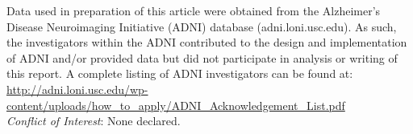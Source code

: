 Data used in preparation of this article were obtained from the Alzheimer's Disease Neuroimaging Initiative (ADNI) database (adni.loni.usc.edu). As such, the investigators within the ADNI contributed to the design and implementation of ADNI and/or provided data but did not participate in analysis or writing of this report. A complete listing of ADNI investigators can be found at: \url{http://adni.loni.usc.edu/wp-content/uploads/how_to_apply/ADNI_Acknowledgement_List.pdf}\\

{\it Conflict of Interest}: None declared.

%

%





\newpage
\address{Samuel Iddi\\
	Department of Statistics and Actuarial Science\\
	University of Ghana\\
	Legon-Accra, Ghana\\ 
	\url{https://orcid.org/0000-0002-2366-2774}\\
	\\
	also\\
Data Measurement and Evaluation Unit\\
African Population and Health Research Center (APHRC)\\
Nairobi, Kenya\\
}

\address{Michael C Donohue\\
Alzheimer's Therapeutic Research Institute\\
Keck School of Medicine\\
University of Southern California\\
San Diego, USA\\
\url{https://orcid.org/0000-0001-6026-2238}\\
}

